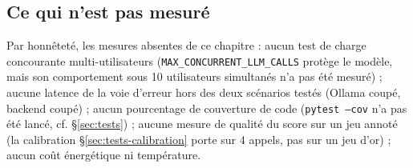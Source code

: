 \subsection{Ce qui n'est pas mesuré}
\label{sec:perf-nonsources}

Par honnêteté, les mesures absentes de ce chapitre : aucun test de charge
concourante multi-utilisateurs (\texttt{MAX\_CONCURRENT\_LLM\_CALLS} protège le
modèle, mais son comportement sous 10 utilisateurs simultanés n'a pas été
mesuré) ; aucune latence de la voie d'erreur hors des deux scénarios testés
(Ollama coupé, backend coupé) ; aucun pourcentage de couverture de code
(\texttt{pytest --cov} n'a pas été lancé, cf. §\ref{sec:tests}) ; aucune mesure
de qualité du score sur un jeu annoté (la calibration
§\ref{sec:tests-calibration} porte sur 4 appels, pas sur un jeu d'or) ; aucun
coût énergétique ni température.
